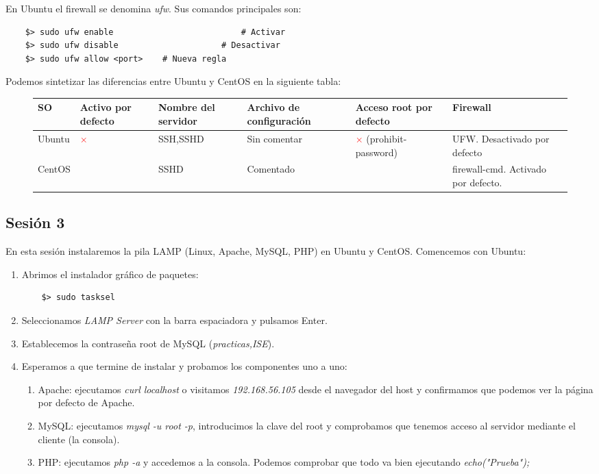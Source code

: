 \documentclass[12pt,spanish]{article}
\newcommand{\greencheck}{}%
\DeclareRobustCommand{\greencheck}{%
  \tikz\fill[scale=0.4, color=green]
  (0,.35) -- (.25,0) -- (1,.7) -- (.25,.15) -- cycle;%
}
\begin{document}
En Ubuntu el firewall se denomina \textit{ufw}. Sus comandos principales son:
\begin{lstlisting}
	$> sudo ufw enable							# Activar
	$> sudo ufw disable						# Desactivar
	$> sudo ufw allow <port>	# Nueva regla
\end{lstlisting}

Podemos sintetizar las diferencias entre Ubuntu y CentOS en la siguiente tabla:
\begin{figure}[H]
	\centering
	\begin{tabular}{|m{1.4cm}|m{2cm}|m{2.2cm}|m{2.2cm}|m{3cm}|m{1.5cm}|}
		\hline
		 	SO & Activo por defecto & Nombre del servidor & Archivo de configuración & Acceso root por defecto & Firewall \\
		 \hline
		 Ubuntu & \textcolor{red}{$\times$} & SSH,SSHD & Sin comentar & \textcolor{red}{$\times$} (prohibit-password) & UFW. Desactivado por defecto \\
		 \hline
		 CentOS & \greencheck & SSHD & Comentado & \greencheck & firewall-cmd. Activado por defecto.\\
		 \hline

	\end{tabular}
\end{figure}

\subsection{Sesión 3}
En esta sesión instalaremos la pila LAMP (Linux, Apache, MySQL, PHP) en Ubuntu y CentOS.
Comencemos con Ubuntu:

\begin{enumerate}
  \item Abrimos el instalador gráfico de paquetes:
  \begin{lstlisting}
  	$> sudo tasksel
  \end{lstlisting}
  \item Seleccionamos \textit{LAMP Server} con la barra espaciadora y pulsamos Enter.
  \item Establecemos la contraseña root de MySQL (\textit{practicas,ISE}).
  \item Esperamos a que termine de instalar y probamos los componentes uno a uno:
  \begin{enumerate}
    \item Apache: ejecutamos \textit{curl localhost} o visitamos \textit{192.168.56.105} desde el navegador del host y confirmamos que podemos ver la página por defecto de Apache.
    \item MySQL: ejecutamos \textit{mysql -u root -p}, introducimos la clave del root y comprobamos que tenemos acceso al servidor mediante el cliente (la consola).
    \item PHP: ejecutamos \textit{php -a} y accedemos a la consola. Podemos comprobar que todo va bien ejecutando \textit{echo("Prueba");}
  \end{enumerate}
\end{enumerate}
\end{document}
